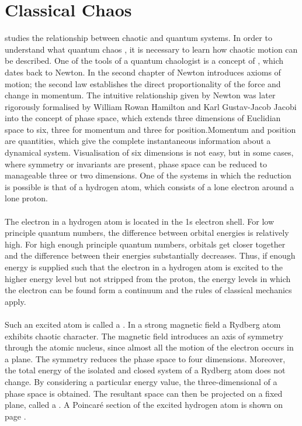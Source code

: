 \section*{Classical Chaos}
  \cite{berry163} studies the relationship between chaotic and quantum systems. In order to understand what quantum chaos , it is necessary to learn how chaotic motion can be described. One of the tools of a quantum chaologist is a concept of , which dates back to Newton.\cites{gutz}{newt} In the second chapter of  Newton introduces axioms of motion; the second law establishes the direct proportionality of the force and change in momentum. The intuitive relationship given by Newton was later rigorously formalised by William Rowan Hamilton and Karl Gustav-Jacob Jacobi into the concept of phase space, which extends three dimensions of Euclidian space to six, three for momentum and three for position.\cite{meh, gutz}Momentum and position are  quantities, which give the complete instantaneous information about a dynamical system.\cite{port} Visualisation of six dimensions is not easy, but in some cases, where symmetry or invariants are present, phase space can be reduced to manageable three or two dimensions. One of the systems in which the reduction is possible is that of a hydrogen atom, which consists of a lone electron around a lone proton.\cite{gutz}\\\\
The electron in a hydrogen atom is located in the 1s electron shell. For low principle quantum numbers, the difference between orbital energies is relatively high. For high enough principle quantum numbers, orbitals get closer together and the difference between their energies substantially decreases. Thus, if enough energy is supplied such that the electron in a hydrogen atom is excited to the higher energy level but not stripped from the proton, the energy levels in which the electron can be found form a continuum and the rules of classical mechanics apply.\cite{port}\\\\
Such an excited atom is called a . In a strong magnetic field a Rydberg atom exhibits chaotic character. The magnetic field introduces an axis of symmetry through the atomic nucleus, since almost all the motion of the electron occurs in a plane. The symmetry reduces the phase space to four dimensions. Moreover, the total energy of the isolated and closed system of a Rydberg atom does not change. By considering a particular energy value, the three-dimensional  of a phase space is obtained. The resultant space can then be projected on a fixed plane, called a . A Poincar\'e section of the excited hydrogen atom is shown on page \pageref{fig:1}.\\\\

